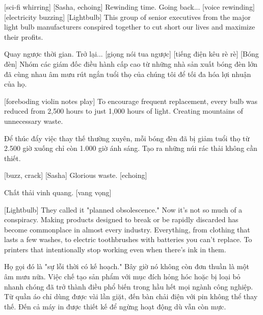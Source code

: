 \documentclass[a4paper]{article}
\begin{document}
	[sci-fi whirring]
	[Sasha, echoing] Rewinding time.
	Going back...
	[voice rewinding]
	[electricity buzzing]
	[Lightbulb] This group of senior executives from the major light bulb manufacturers conspired together to cut short our lives and maximize their profits.
	
	\begin{vietnamese-v2}
		 Quay ngược thời gian. Trở lại... [giọng nói tua ngược] [tiếng điện kêu rè rè] [Bóng đèn] Nhóm các giám đốc điều hành cấp cao từ những nhà sản xuất bóng đèn lớn đã cùng nhau âm mưu rút ngắn tuổi thọ của chúng tôi để tối đa hóa lợi nhuận của họ.
	\end{vietnamese-v2}
	
	[foreboding violin notes play]
	To encourage frequent replacement, every bulb was reduced from 2,500 hours to just 1,000 hours of light.
	Creating mountains of unnecessary waste.
	
	\begin{vietnamese-v2}
		 Để thúc đẩy việc thay thế thường xuyên, mỗi bóng đèn đã bị giảm tuổi thọ từ 2.500 giờ xuống chỉ còn 1.000 giờ ánh sáng. Tạo ra những núi rác thải không cần thiết.
	\end{vietnamese-v2}
	
	[buzz, crack]
	[Sasha] Glorious waste. [echoing]
	
	\begin{vietnamese-v2}
		 Chất thải vinh quang. [vang vọng]
	\end{vietnamese-v2}
	
	[Lightbulb] They called it "planned obsolescence."
	Now it's not so much of a conspiracy.
	Making products designed to break or be rapidly discarded has become commonplace in almost every industry.
	Everything, from clothing that lasts a few washes, to electric toothbrushes with batteries you can't replace.
	To printers that intentionally stop working even when there's ink in them.
	
	\begin{vietnamese-v2}
		 Họ gọi đó là "sự lỗi thời có kế hoạch." Bây giờ nó không còn đơn thuần là một âm mưu nữa. Việc chế tạo sản phẩm với mục đích hỏng hóc hoặc bị loại bỏ nhanh chóng đã trở thành điều phổ biến trong hầu hết mọi ngành công nghiệp. Từ quần áo chỉ dùng được vài lần giặt, đến bàn chải điện với pin không thể thay thế. Đến cả máy in được thiết kế để ngừng hoạt động dù vẫn còn mực.
	\end{vietnamese-v2}
	
\end{document}

